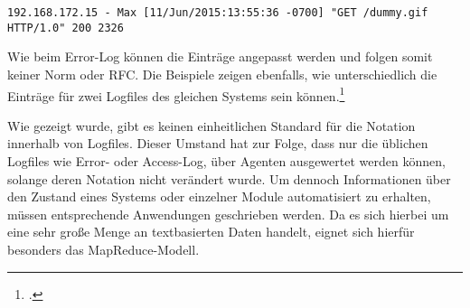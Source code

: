 \begin{lstlisting}[caption=Beispieleintrag für ein Apache-Access-Log,label=lst:BeispieleintragApacheAccessLog]
192.168.172.15 - Max [11/Jun/2015:13:55:36 -0700] "GET /dummy.gif HTTP/1.0" 200 2326
\end{lstlisting}

Wie beim Error-Log können die Einträge angepasst werden und folgen somit keiner Norm oder \ac{RFC}. Die Beispiele zeigen ebenfalls, wie unterschiedlich die Einträge für zwei Logfiles des gleichen Systems sein können.\footcite[Vgl.][]{ApacheAccessLog.2015}



Wie gezeigt wurde, gibt es keinen einheitlichen Standard für die Notation innerhalb von Logfiles. Dieser Umstand hat zur Folge, dass nur die üblichen Logfiles wie Error- oder Access-Log, über Agenten ausgewertet werden können, solange deren Notation nicht verändert wurde. Um dennoch Informationen über den Zustand eines Systems oder einzelner Module automatisiert zu erhalten, müssen entsprechende Anwendungen geschrieben werden. Da es sich hierbei um eine sehr große Menge an textbasierten Daten handelt, eignet sich hierfür besonders das MapReduce-Modell.



